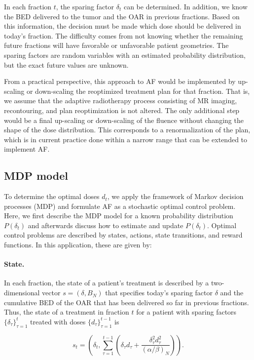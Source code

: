 \documentclass[11pt]{article}
\begin{document}
In each fraction $t$, the sparing factor $\delta_t$ can be determined. In addition, we know the BED delivered to the tumor and the OAR in previous fractions. Based on this information, the decision must be made which dose should be delivered in today's fraction. The difficulty comes from not knowing whether the remaining future fractions will have favorable or unfavorable patient geometries. The sparing factors are random variables with an estimated probability distribution, but the exact future values are unknown.

From a practical perspective, this approach to AF would be implemented by up-scaling or down-scaling the reoptimized treatment plan for that fraction. That is, we assume that the adaptive radiotherapy process consisting of MR imaging, recontouring, and plan reoptimization is not altered. The only additional step would be a final up-scaling or down-scaling of the fluence without changing the shape of the dose distribution. This corresponds to a renormalization of the plan, which is in current practice done within a narrow range that can be extended to implement AF.

\subsection{MDP model}

To determine the optimal doses $d_t$, we apply the framework of Markov decision processes (MDP) and formulate AF as a stochastic optimal control problem. Here, we first describe the MDP model for a known probability distribution $P(\delta_t)$ and afterwards discuss how to estimate and update $P(\delta_t)$. Optimal control problems are described by states, actions, state transitions, and reward functions. In this application, these are given by:

\paragraph{State.}
In each fraction, the state of a patient's treatment is described by a two-dimensional vector $s = (\delta, B_N)$ that specifies today's sparing factor $\delta$ and the cumulative BED of the OAR that has been delivered so far in previous fractions. Thus, the state of a treatment in fraction $t$ for a patient with sparing factors $\{\delta_{\tau}\}_{\tau=1}^{t}$ treated with doses $\{d_{\tau}\}_{\tau=1}^{t-1}$ is

\begin{equation}
s_t = \left(\delta_t, \sum_{\tau=1}^{t-1}\left(\delta_{\tau} d_{\tau} + \frac{\delta_{\tau}^2 d_{\tau}^2}{(\alpha/\beta)_N}\right)\right).
\label{eq:state-two-dim}
\end{equation}
\end{document}
